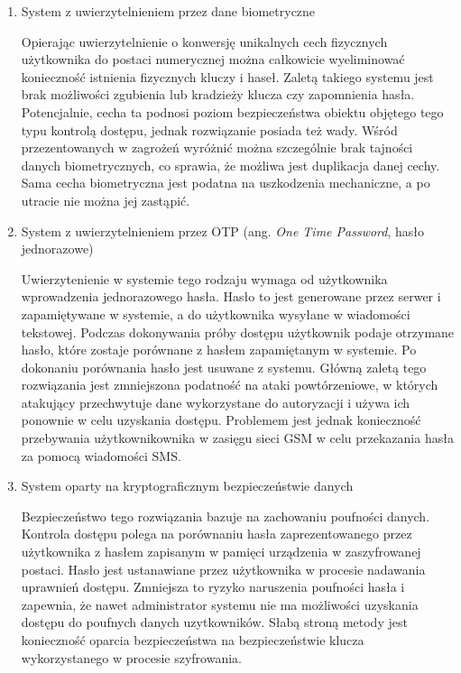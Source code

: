 \begin{enumerate}[label=\Alph*.]
			\item System z uwierzytelnieniem przez dane biometryczne

				Opierając uwierzytelnienie o konwersję unikalnych cech fizycznych użytkownika do postaci numerycznej można całkowicie wyeliminować konieczność istnienia fizycznych kluczy i haseł. Zaletą takiego systemu jest brak możliwości zgubienia lub kradzieży klucza czy zapomnienia hasła. Potencjalnie, cecha ta podnosi poziom bezpieczeństwa obiektu objętego tego typu kontrolą dostępu, jednak rozwiązanie posiada też wady. Wśród przezentowanych w \cite{biometric-system-vulnerabilities} zagrożeń wyróżnić można szczególnie brak tajności danych biometrycznych, co sprawia, że możliwa jest duplikacja danej cechy. Sama cecha biometryczna jest podatna na uszkodzenia mechaniczne, a po utracie nie można jej zastąpić.

			\item System z uwierzytelnieniem przez OTP (ang. \textit{One Time Password}, hasło jednorazowe)

				Uwierzytenienie w systemie tego rodzaju wymaga od użytkownika wprowadzenia jednorazowego hasła. Hasło to jest generowane przez serwer i zapamiętywane w systemie, a do użytkownika wysyłane w wiadomości tekstowej. Podczas dokonywania próby dostępu użytkownik podaje otrzymane hasło, które zostaje porównane z hasłem zapamiętanym w systemie. Po dokonaniu porównania hasło jest usuwane z systemu. Główną zaletą tego rozwiązania jest zmniejszona podatność na ataki powtórzeniowe, w których atakujący przechwytuje dane wykorzystane do autoryzacji i używa ich ponownie w celu uzyskania dostępu. Problemem jest jednak konieczność przebywania użytkownikownika w zasięgu sieci GSM w celu przekazania hasła za pomocą wiadomości SMS.

			\item System oparty na kryptograficznym bezpieczeństwie danych

				Bezpieczeństwo tego rozwiązania bazuje na zachowaniu poufności danych. Kontrola dostępu polega na porównaniu hasła zaprezentowanego przez użytkownika z hasłem zapisanym w pamięci urządzenia w zaszyfrowanej postaci. Hasło jest ustanawiane przez użytkownika w procesie nadawania uprawnień dostępu. Zmniejsza to ryzyko naruszenia poufności hasła i zapewnia, że nawet administrator systemu nie ma możliwości uzyskania dostępu do poufnych danych uzytkowników. Słabą stroną metody jest konieczność oparcia bezpieczeństwa na bezpieczeństwie klucza wykorzystanego w procesie szyfrowania.


\end{enumerate}
